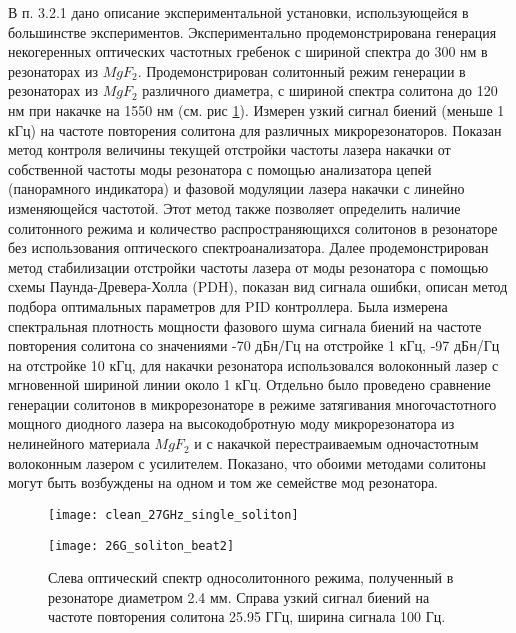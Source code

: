 В п. 3.2.1 дано описание экспериментальной установки, использующейся в большинстве экспериментов. Экспериментально продемонстрирована генерация некогеренных оптических частотных гребенок с шириной спектра до 300 нм в резонаторах из $MgF_2$. Продемонстрирован солитонный режим генерации в резонаторах из $MgF_2$ различного диаметра, с шириной спектра солитона до 120 нм при накачке на 1550 нм (см. рис \ref{clean_27GHz_single_soliton}). Измерен узкий сигнал биений (меньше 1 кГц) на частоте повторения солитона для различных микрорезонаторов. Показан метод контроля величины текущей отстройки частоты лазера накачки от собственной частоты моды резонатора с помощью анализатора цепей (панорамного индикатора) и фазовой модуляции лазера накачки с линейно изменяющейся частотой. Этот метод также позволяет определить наличие солитонного режима и количество распространяющихся солитонов в резонаторе без использования оптического спектроанализатора. Далее продемонстрирован метод стабилизации отстройки частоты лазера от моды резонатора с помощью схемы Паунда-Древера-Холла (PDH), показан вид сигнала ошибки, описан метод подбора оптимальных параметров для PID контроллера. Была измерена спектральная плотность мощности фазового шума сигнала биений на частоте повторения солитона со значениями -70 дБн/Гц на отстройке 1 кГц, -97 дБн/Гц на отстройке 10 кГц, для накачки резонатора использовался волоконный лазер с мгновенной шириной линии около 1 кГц. Отдельно было проведено сравнение генерации солитонов в микрорезонаторе в режиме затягивания многочастотного мощного диодного лазера на высокодобротную моду микрорезонатора из нелинейного материала $MgF_2$ и с накачкой перестраиваемым одночастотным волоконным лазером с усилителем. Показано, что обоими методами солитоны могут быть возбуждены на одном и том же семействе мод резонатора.

\begin{figure}[!htb]
  \begin{minipage}{0.49\linewidth}\centering
    \texttt{[image: clean\_27GHz\_single\_soliton]}
  \end{minipage}
  \hfill
  \begin{minipage}{0.49\linewidth}\centering
    \texttt{[image: 26G\_soliton\_beat2]}
  \end{minipage}
  \caption{Слева оптический спектр односолитонного режима, полученный в резонаторе диаметром 2.4 мм. Справа узкий сигнал биений на частоте повторения солитона 25.95 ГГц, ширина сигнала 100 Гц.}
  \label{clean_27GHz_single_soliton}
\end{figure}

